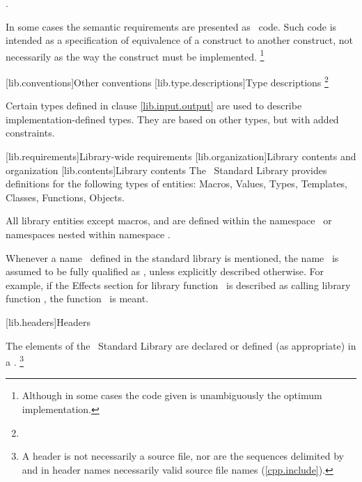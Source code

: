 \documentclass[american,twoside]{book}
\begin{document}
\pnum
{}.

\pnum
In some cases the semantic requirements are presented as \Cpp\ code.
Such code is intended as a
specification of equivalence of a construct to another construct, not necessarily as the way the construct
must be implemented.%
\footnote{
Although in some cases the code given is unambiguously the optimum implementation.
}

[lib.conventions]{Other conventions}
[lib.type.descriptions]{Type descriptions}
\pnum
{}%
\footnote{
}

\pnum
Certain types defined in clause \ref{lib.input.output} are used to describe implementation-defined types.
%
They are based on other types, but with added constraints.

[lib.requirements]{Library-wide requirements}
[lib.organization]{Library contents and organization}
[lib.contents]{Library contents}
\pnum
The \Cpp\ Standard Library provides definitions for the following types of entities:
Macros, Values, Types, Templates, Classes,
Functions, Objects.

\pnum
All library entities except macros,
and
are defined within the namespace
\
or namespaces nested within namespace
\tcode{std}.%
\

\pnum
Whenever a name \ defined in the standard library is mentioned,
the name \tcode{x}\ is assumed to be fully qualified as
,
unless explicitly described otherwise. For example, if the Effects section
for library function \tcode{F}\ is described as calling library function ,
the function
\
is meant.

[lib.headers]{Headers}

\pnum
The elements of the \Cpp\ Standard Library are declared or defined (as appropriate) in a
.%
\footnote{
A header is not necessarily a source file, nor are the sequences delimited by
\tcode{<}
and
\tcode{>}
in header names necessarily valid source file names (\ref{cpp.include}).
}
\end{document}
